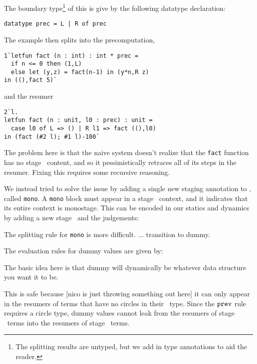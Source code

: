 The boundary type\footnote{The splitting results are untyped, but we add in type annotations to aid the reader.} of this is give by the following datatype declaration:
\begin{lstlisting}
datatype prec = L | R of prec
\end{lstlisting}
The example then splits into the precomputation,
\begin{lstlisting}
1`letfun fact (n : int) : int * prec = 
  if n <= 0 then (1,L) 
  else let (y,z) = fact(n-1) in (y*n,R z)
in ((),fact 5)`
\end{lstlisting}
and the resumer
\begin{lstlisting}
2`l.
letfun fact (n : unit, l0 : prec) : unit = 
  case l0 of L => () | R l1 => fact ((),l0)
in (fact (#2 l); #1 l)-100`
\end{lstlisting}
The problem here is that the naive system doesn't realize that the \texttt{fact} function has no stage \bbtwo\ content,
and so it pessimistically retraces all of its steps in the resumer.  
Fixing this requires some recursive reasoning.  

We instead tried to solve the issue by adding a single new staging annotation to \lang, called \texttt{mono}.  
A \texttt{mono} block must appear in a stage \bbone\ context, and it indicates that its entire context is monostage.
This can be encoded in our statics and dynamics by adding a new stage \bbmono\ and the judgements:

The splitting rule for \texttt{mono} is more difficult.
...
transition to dummy.

The evaluation rules for dummy values are given by:

The basic idea here is that dummy will dynamically be whatever data structure you want it to be.

This is safe because [nico is just throwing something out here] 
it can only appear in the resumers of terms that have no circles in their \lang\ type.
Since the ${\tt prev}$ rule requires a circle type, dummy values cannot leak from
the resumers of stage \bbone\ terms into the resumers of stage \bbtwo\ terms.



